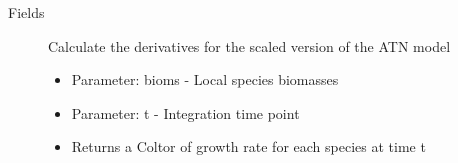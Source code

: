 \documentclass[letterpaper]{book}
\begin{document}
\begin{Section}{Fields}
\begin{description}
\item[] Calculate the derivatives for the scaled version of the ATN model \begin{itemize}

\item{} Parameter: bioms -  Local species biomasses
\item{} Parameter: t - Integration time point
\item{} Returns a Coltor of growth rate for each species at time t

\end{itemize}


\end{description}
\end{Section}
\printindex{}
\end{document}
